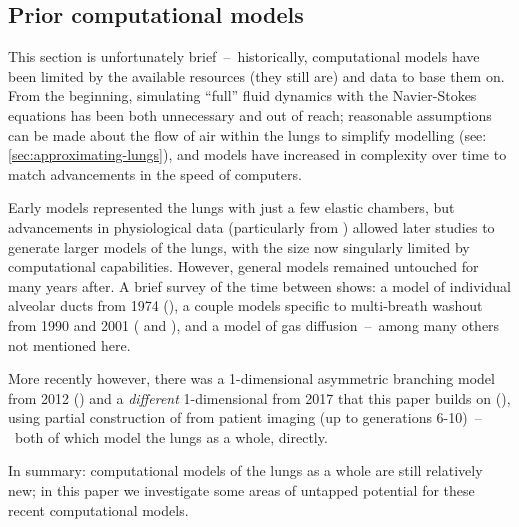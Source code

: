 \subsection{Prior computational models} \label{sec:prior-models}

This section is unfortunately brief~--~historically, computational models have been limited by the
available resources (they still are) and data to base them on. From the beginning, simulating
``full'' fluid dynamics with the Navier-Stokes equations has been both unnecessary and out of reach;
reasonable assumptions can be made about the flow of air within the lungs to simplify modelling
(see: \autoref{sec:approximating-lungs}), and models have increased in complexity over time to match
advancements in the speed of computers.

Early models represented the lungs with just a few elastic chambers, but advancements in
physiological data (particularly from \cite{Weibel1963}) allowed later studies to generate larger
models of the lungs, with the size now singularly limited by computational capabilities. However,
general models remained untouched for many years after. A brief survey of the time between shows: a
model of individual alveolar ducts from 1974 (\cite{Paiva1974}), a couple models specific to
multi-breath washout from 1990 and 2001 (\cite{VerbanckEtAl1990} and \cite{TawhaiHunter2001}), and a
model of  gas diffusion~--~among many others not mentioned here.

More recently however, there was a 1-dimensional asymmetric branching model from 2012
(\cite{HenryEtAl2012}) and a \textit{different} 1-dimensional from 2017 that this paper builds on
(\cite{FoyEtAl2017}), using partial construction of from patient imaging (up to generations
6-10)~--~both of which model the lungs as a whole, directly.

In summary: computational models of the lungs as a whole are still relatively new; in this paper we
investigate some areas of untapped potential for these recent computational models.

